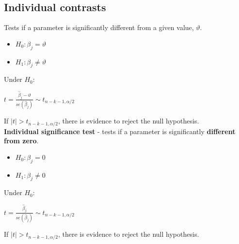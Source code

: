 \documentclass[10pt, a4paper, landscape]{extarticle}
\begin{document}
\begin{multicols}{3}
	\subsection*{Individual contrasts}
		Tests if a parameter is significantly different from a given value, $\vartheta$.
		\begin{itemize}[leftmargin=*]
			\item $H_0: \beta_j = \vartheta$
			\item $H_1: \beta_j \neq \vartheta$
		\end{itemize}
		Under $H_0$:
		\begin{center}
			$t = \frac{\hat{\beta}_j - \vartheta}{se(\hat{\beta}_j)} \sim t_{n-k-1, \alpha/2}$
		\end{center}
		If $\mid t \mid > t_{n-k-1, \alpha/2}$, there is evidence to reject the null hypothesis.
		\\ \textbf{Individual significance test} - tests if a parameter is significantly \textbf{different from zero}.
		\begin{itemize}[leftmargin=*]
			\item $H_0: \beta_j = 0$
			\item $H_1: \beta_j \neq 0$
		\end{itemize}
		Under $H_0$:
		\begin{center}
			$t = \frac{\hat{\beta}_j}{se(\hat{\beta}_j)} \sim t_{n-k-1, \alpha/2}$
		\end{center}
		If $\mid t \mid > t_{n-k-1, \alpha/2}$, there is evidence to reject the null hypothesis.

\end{multicols}
\end{document}
